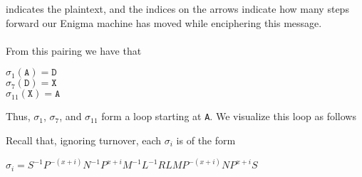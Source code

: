 indicates the plaintext,
and the indices on the arrows indicate how many steps forward our
Enigma machine has moved while enciphering this message.
\\\\From this pairing we have that
\begin{center}
  $\sigma_1(\texttt{A}) = {\texttt{D}}$\\
  $\sigma_7(\texttt{D}) = {\texttt{X}}$\\
  $\sigma_{11}(\texttt{X}) = {\texttt{A}}$\\
\end{center}
Thus, $\sigma_1$, $\sigma_7$, and $\sigma_{11}$ form a loop starting
at \texttt{A}. We visualize this loop as follows
\begin{center}
\end{center}
Recall that, ignoring turnover, each $\sigma_i$ is of the form
\begin{center}
  $\sigma_i = S^{-1}P^{-(x+i)}N^{-1}P^{x+i}M^{-1}L^{-1}RLMP^{-(x+i)}NP^{x+i}S$
\end{center}

